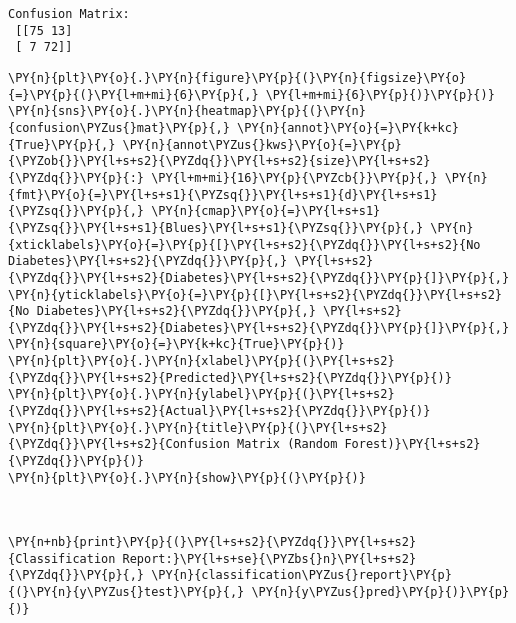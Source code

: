     \begin{Verbatim}[commandchars=\\\{\}]
Confusion Matrix:
 [[75 13]
 [ 7 72]]
    \end{Verbatim}

    \begin{tcolorbox}[breakable, size=fbox, boxrule=1pt, pad at break*=1mm,colback=cellbackground, colframe=cellborder]
\begin{Verbatim}[commandchars=\\\{\}]
\PY{n}{plt}\PY{o}{.}\PY{n}{figure}\PY{p}{(}\PY{n}{figsize}\PY{o}{=}\PY{p}{(}\PY{l+m+mi}{6}\PY{p}{,} \PY{l+m+mi}{6}\PY{p}{)}\PY{p}{)}
\PY{n}{sns}\PY{o}{.}\PY{n}{heatmap}\PY{p}{(}\PY{n}{confusion\PYZus{}mat}\PY{p}{,} \PY{n}{annot}\PY{o}{=}\PY{k+kc}{True}\PY{p}{,} \PY{n}{annot\PYZus{}kws}\PY{o}{=}\PY{p}{\PYZob{}}\PY{l+s+s2}{\PYZdq{}}\PY{l+s+s2}{size}\PY{l+s+s2}{\PYZdq{}}\PY{p}{:} \PY{l+m+mi}{16}\PY{p}{\PYZcb{}}\PY{p}{,} \PY{n}{fmt}\PY{o}{=}\PY{l+s+s1}{\PYZsq{}}\PY{l+s+s1}{d}\PY{l+s+s1}{\PYZsq{}}\PY{p}{,} \PY{n}{cmap}\PY{o}{=}\PY{l+s+s1}{\PYZsq{}}\PY{l+s+s1}{Blues}\PY{l+s+s1}{\PYZsq{}}\PY{p}{,} \PY{n}{xticklabels}\PY{o}{=}\PY{p}{[}\PY{l+s+s2}{\PYZdq{}}\PY{l+s+s2}{No Diabetes}\PY{l+s+s2}{\PYZdq{}}\PY{p}{,} \PY{l+s+s2}{\PYZdq{}}\PY{l+s+s2}{Diabetes}\PY{l+s+s2}{\PYZdq{}}\PY{p}{]}\PY{p}{,} \PY{n}{yticklabels}\PY{o}{=}\PY{p}{[}\PY{l+s+s2}{\PYZdq{}}\PY{l+s+s2}{No Diabetes}\PY{l+s+s2}{\PYZdq{}}\PY{p}{,} \PY{l+s+s2}{\PYZdq{}}\PY{l+s+s2}{Diabetes}\PY{l+s+s2}{\PYZdq{}}\PY{p}{]}\PY{p}{,} \PY{n}{square}\PY{o}{=}\PY{k+kc}{True}\PY{p}{)}
\PY{n}{plt}\PY{o}{.}\PY{n}{xlabel}\PY{p}{(}\PY{l+s+s2}{\PYZdq{}}\PY{l+s+s2}{Predicted}\PY{l+s+s2}{\PYZdq{}}\PY{p}{)}
\PY{n}{plt}\PY{o}{.}\PY{n}{ylabel}\PY{p}{(}\PY{l+s+s2}{\PYZdq{}}\PY{l+s+s2}{Actual}\PY{l+s+s2}{\PYZdq{}}\PY{p}{)}
\PY{n}{plt}\PY{o}{.}\PY{n}{title}\PY{p}{(}\PY{l+s+s2}{\PYZdq{}}\PY{l+s+s2}{Confusion Matrix (Random Forest)}\PY{l+s+s2}{\PYZdq{}}\PY{p}{)}
\PY{n}{plt}\PY{o}{.}\PY{n}{show}\PY{p}{(}\PY{p}{)}
\end{Verbatim}
\end{tcolorbox}

    \begin{center}
    \end{center}
    { \hspace*{\fill} \\}
    
    \begin{tcolorbox}[breakable, size=fbox, boxrule=1pt, pad at break*=1mm,colback=cellbackground, colframe=cellborder]
\begin{Verbatim}[commandchars=\\\{\}]
\PY{n+nb}{print}\PY{p}{(}\PY{l+s+s2}{\PYZdq{}}\PY{l+s+s2}{Classification Report:}\PY{l+s+se}{\PYZbs{}n}\PY{l+s+s2}{\PYZdq{}}\PY{p}{,} \PY{n}{classification\PYZus{}report}\PY{p}{(}\PY{n}{y\PYZus{}test}\PY{p}{,} \PY{n}{y\PYZus{}pred}\PY{p}{)}\PY{p}{)}
\end{Verbatim}
\end{tcolorbox}

